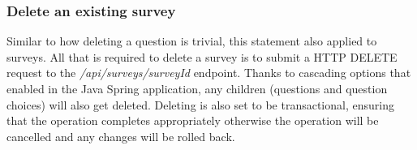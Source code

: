 \subsubsection*{Delete an existing survey}

Similar to how deleting a question is trivial, this statement also applied to surveys.
All that is required to delete a survey is to submit a HTTP DELETE request to the \textit{/api/surveys/{surveyId}} endpoint.
Thanks to cascading options that enabled in the Java Spring application, any children (questions and question choices) will also
get deleted.
Deleting is also set to be transactional, ensuring that the operation completes appropriately otherwise the operation will be cancelled
and any changes will be rolled back.
